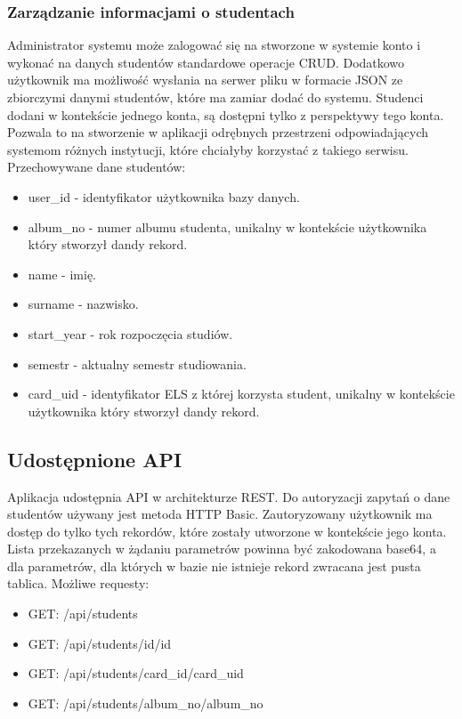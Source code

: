 \documentclass[declaration,shortabstract, mgr]{iithesis}
\begin{document}
\subsubsection{Zarządzanie informacjami o studentach}
\indent Administrator systemu może zalogować się na stworzone w systemie konto i wykonać na danych studentów standardowe operacje CRUD. Dodatkowo użytkownik ma możliwość wysłania na serwer pliku w formacie JSON ze zbiorczymi danymi studentów, które ma zamiar dodać do systemu. Studenci dodani w kontekście jednego konta, są dostępni tylko z perspektywy tego konta.
Pozwala to na stworzenie w aplikacji odrębnych przestrzeni odpowiadających systemom różnych instytucji, które chciałyby korzystać z takiego serwisu.\\
\indent Przechowywane dane studentów:
\begin{itemize}
\item user\_id - identyfikator użytkownika bazy danych.
\item album\_no - numer albumu studenta, unikalny w kontekście użytkownika który stworzył dandy rekord.
\item name - imię.
\item surname - nazwisko.
\item start\_year - rok rozpoczęcia studiów.
\item semestr - aktualny semestr studiowania.
\item card\_uid - identyfikator ELS z której korzysta student, unikalny w kontekście użytkownika który stworzył dandy rekord.
\end{itemize}
\subsection{Udostępnione API}
\indent Aplikacja udostępnia API w architekturze REST\cite{rest}. Do autoryzacji zapytań o dane studentów używany jest metoda HTTP Basic. Zautoryzowany użytkownik ma dostęp do tylko tych rekordów, które zostały utworzone w kontekście jego konta.\\
\indent Lista przekazanych w żądaniu parametrów powinna być zakodowana base64, a dla parametrów, dla których w bazie nie istnieje rekord zwracana jest pusta tablica.
\indent Możliwe requesty:
\begin{itemize}
\item GET: /api/students
\item GET: /api/students/id/{id}
\item GET: /api/students/card\_id/{card\_uid}
\item GET: /api/students/album\_no/{album\_no}
\end{itemize}
\end{document}

